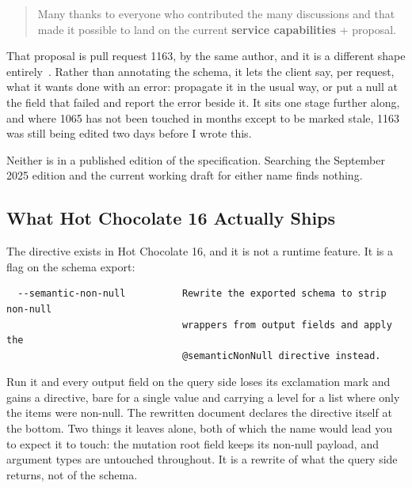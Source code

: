 \begin{quote}
Many thanks to everyone who contributed the many discussions and that made it
possible to land on the current \textbf{service capabilities} + 
proposal.
\end{quote}

%
That proposal is pull request 1163, by the same author, and it is a different
shape entirely~\autocite{graphqlrfc1163}. Rather than annotating the schema, it
lets the client say, per request, what it wants done with an error: propagate
it in the usual way, or put a null at the field that failed and report the error
beside it. It sits one stage further along, and where 1065 has not been touched
in months except to be marked stale, 1163 was still being edited two days
before I wrote this.

%
Neither is in a published edition of the specification. Searching the September
2025 edition and the current working draft for either name finds nothing.

\subsection{What Hot Chocolate 16 Actually Ships}

%
The directive exists in Hot Chocolate 16, and it is not a runtime feature. It
is a flag on the schema export:

\begin{verbatim}
  --semantic-non-null          Rewrite the exported schema to strip non-null
                               wrappers from output fields and apply the
                               @semanticNonNull directive instead.
\end{verbatim}

%
Run it and every output field on the query side loses its exclamation mark and
gains a directive, bare for a single value and carrying a level for a list where
only the items were non-null. The rewritten document declares the directive
itself at the bottom. Two things it leaves alone, both of which the name would
lead you to expect it to touch: the mutation root field keeps its non-null
payload, and argument types are untouched throughout. It is a rewrite of what
the query side returns, not of the schema.

